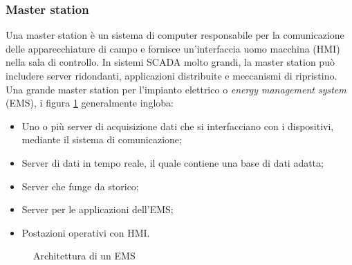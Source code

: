 \subsubsection{Master station}
Una master station è un sistema di computer responsabile per la comunicazione delle apparecchiature di campo e fornisce un'interfaccia uomo macchina (HMI) nella sala di controllo. In sistemi SCADA molto grandi, la master station può includere server ridondanti, applicazioni distribuite e meccanismi di ripristino. Una grande master station per l'impianto elettrico o \emph{energy management system} (EMS), i figura \ref{fig:5} generalmente ingloba:
\begin{itemize}
	\item Uno o più server di acquisizione dati che si interfacciano con i dispositivi, mediante il sistema di comunicazione;
	\item Server di dati in tempo reale, il quale contiene una base di dati adatta;
	\item Server che funge da storico;
	\item Server per le applicazioni dell'EMS;
	\item Postazioni operativi con HMI.
\end{itemize}    

\begin{figure}[h] 
\caption{Architettura di un EMS}\label{fig:5}
\end{figure}

